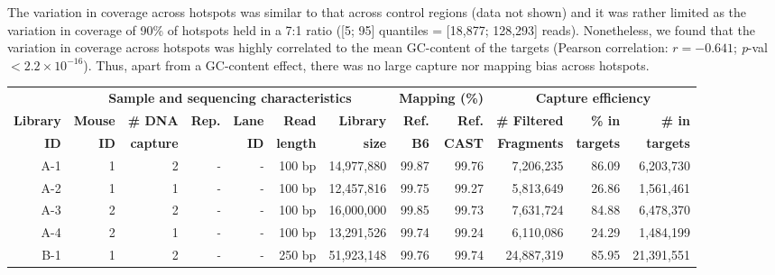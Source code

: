 The variation in coverage across hotspots was similar to that across control regions (data not shown) and it was rather limited as the variation in coverage of 90\% of hotspots held in a 7:1 ratio ([5; 95] quantiles = [18,877; 128,293] reads).
Nonetheless, we found that the variation in coverage across hotspots was highly correlated to the mean GC-content of the targets (Pearson correlation: ${r = -0.641}$; \textit{p}-val $< 2.2 \times 10^{-16}$).
Thus, apart from a GC-content effect, there was no large capture nor mapping bias across hotspots.


\begin{sidewaystable}[p]
    \centering
	\begin{adjustbox}{width = 1\textwidth}
    \begin{tabular}{rrrrrrrrrrrr}
        \toprule
        \textbf{} & \multicolumn{6}{c}{\textbf{Sample and sequencing characteristics}} & \multicolumn{2}{c}{\textbf{Mapping (\%)}} & \multicolumn{3}{c}{\textbf{Capture efficiency}} \\
		\cmidrule(l){2-7} \cmidrule(l){8-9} \cmidrule(l){10-12}
        \textbf{Library} & \textbf{Mouse} & \textbf{\# DNA} & \textbf{Rep.} & \textbf{Lane} & \textbf{Read} & \textbf{Library} & \textbf{Ref.} & \textbf{Ref.} & \textbf{\# Filtered} & \textbf{\% in} & \textbf{\# in} \\
        \textbf{ID} & \textbf{ID} & \textbf{capture} & \textbf{} & \textbf{ID} & \textbf{length} & \textbf{size} & \textbf{B6} & \textbf{CAST} & \textbf{Fragments} & \textbf{targets} & \textbf{targets} \\
		\cmidrule(l){1-1} \cmidrule(l){2-7} \cmidrule(l){8-9} \cmidrule(l){10-12}
		A-1 & 1 & 2 & \textit{-} & \textit{-} & 100 bp & 14,977,880 & 99.87 & 99.76 & 7,206,235 & 86.09 & 6,203,730 \\
        A-2 & 1 & 1 & \textit{-} & \textit{-} & 100 bp & 12,457,816 & 99.75 & 99.27 & 5,813,649 & 26.86 & 1,561,461 \\
        A-3 & 2 & 2 & \textit{-} & \textit{-} & 100 bp & 16,000,000 & 99.85 & 99.73 & 7,631,724 & 84.88 & 6,478,370 \\
        A-4 & 2 & 1 & \textit{-} & \textit{-} & 100 bp & 13,291,526 & 99.74 & 99.24 & 6,110,086 & 24.29 & 1,484,199 \\
		\cmidrule(l){1-1} \cmidrule(l){2-7} \cmidrule(l){8-9} \cmidrule(l){10-12}
		B-1 & 1 & 2 & \textit{-} & \textit{-} & 250 bp & 51,923,148 & 99.76 & 99.74 & 24,887,319 & 85.95 & 21,391,551 \\

\end{tabular}
\end{adjustbox}
\end{sidewaystable}
